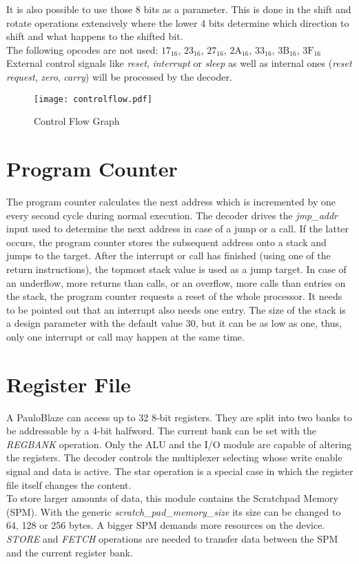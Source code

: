 It is also possible to use those 8 bits as a parameter.
This is done in the shift and rotate operations extensively where the lower 4 bits determine which direction to shift and what happens to the shifted bit.
\\
The following opcodes are not used: $\text{17}_{16}$, $\text{23}_{16}$, $\text{27}_{16}$, $\text{2A}_{16}$, $\text{33}_{16}$, $\text{3B}_{16}$, $\text{3F}_{16}$
\\
External control signals like \emph{reset}, \emph{interrupt} or \emph{sleep} as well as internal ones (\emph{reset request}, \emph{zero}, \emph{carry}) will be processed by the decoder.


\begin{figure}[H]
	\sffamily
\label{fig:controlflow}
\centering
\texttt{[image: controlflow.pdf]}
\caption{Control Flow Graph}
\end{figure}

\section{Program Counter}
\label{sec:pc}
The program counter calculates the next address which is incremented by one every second cycle during normal execution.
The decoder drives the \emph{jmp\_addr} input used to determine the next address in case of a jump or a call.
If the latter occurs, the program counter stores the subsequent address onto a stack and jumps to the target.
After the interrupt or call has finished (using one of the return instructions), the topmost stack value is used as a jump target.
In case of an underflow, more returns than calls, or an overflow, more calls than entries on the stack, the program counter requests a reset of the whole processor.
It needs to be pointed out that an interrupt also needs one entry.
The size of the stack is a design parameter with the default value 30, but it can be as low as one, thus, only one interrupt or call may happen at the same time.

\section{Register File}
\label{sec:reg}
A PauloBlaze can access up to 32 8-bit registers.
They are split into two banks to be addressable by a 4-bit halfword.
The current bank can be set with the \emph{REGBANK} operation.
Only the ALU and the I/O module are capable of altering the registers.
The decoder controls the multiplexer selecting whose write enable signal and data is active.
The star operation is a special case in which the register file itself changes the content.
\\
To store larger amounts of data, this module contains the Scratchpad Memory (SPM).
With the generic \emph{scratch\_pad\_memory\_size} its size can be changed to 64, 128 or 256 bytes.
A bigger SPM demands more resources on the device.
\emph{STORE} and \emph{FETCH} operations are needed to transfer data between the SPM and the current register bank.

